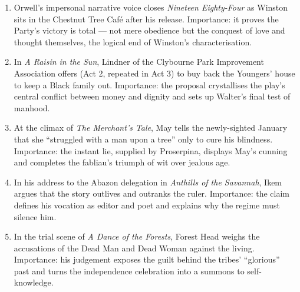 \documentclass[11pt]{article}
\begin{document}
\begin{corrige}
\begin{enumerate}
\item Orwell's impersonal narrative voice closes \emph{Nineteen Eighty-Four} as Winston sits in the Chestnut Tree Caf\'e after his release. Importance: it proves the Party's victory is total --- not mere obedience but the conquest of love and thought themselves, the logical end of Winston's characterisation.
\item In \emph{A Raisin in the Sun}, Lindner of the Clybourne Park Improvement Association offers (Act 2, repeated in Act 3) to buy back the Youngers' house to keep a Black family out. Importance: the proposal crystallises the play's central conflict between money and dignity and sets up Walter's final test of manhood.
\item At the climax of \emph{The Merchant's Tale}, May tells the newly-sighted January that she ``struggled with a man upon a tree'' only to cure his blindness. Importance: the instant lie, supplied by Proserpina, displays May's cunning and completes the fabliau's triumph of wit over jealous age.
\item In his address to the Abazon delegation in \emph{Anthills of the Savannah}, Ikem argues that the story outlives and outranks the ruler. Importance: the claim defines his vocation as editor and poet and explains why the regime must silence him.
\item In the trial scene of \emph{A Dance of the Forests}, Forest Head weighs the accusations of the Dead Man and Dead Woman against the living. Importance: his judgement exposes the guilt behind the tribes' ``glorious'' past and turns the independence celebration into a summons to self-knowledge.
\end{enumerate}
\end{corrige}
\end{document}
